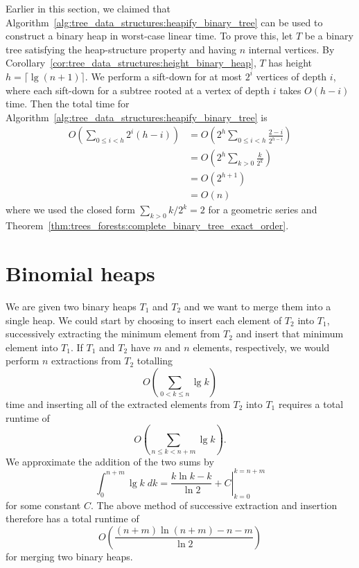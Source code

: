 Earlier in this section, we claimed that
Algorithm~\ref{alg:tree_data_structures:heapify_binary_tree} can be
used to construct a binary heap in worst-case linear time. To prove
this, let $T$ be a binary tree satisfying the heap-structure property
and having $n$ internal vertices. By
Corollary~\ref{cor:tree_data_structures:height_binary_heap}, $T$ has
height $h = \lceil \lg(n + 1) \rceil$. We perform a sift-down for at
most $2^i$ vertices of depth $i$, where each sift-down for a subtree
rooted at a vertex of depth $i$ takes $O(h - i)$ time. Then the total
time for Algorithm~\ref{alg:tree_data_structures:heapify_binary_tree}
is
\begin{align*}
O\left( \sum_{0 \leq i < h} 2^i (h - i) \right)
&=
O\left( 2^h \sum_{0 \leq i < h} \frac{2 - i} {2^{h - i}} \right) \\[4pt]
&=
O\left( 2^h \sum_{k > 0} \frac{k}{2^k} \right) \\[4pt]
&=
O\left( 2^{h + 1} \right) \\[4pt]
&=
O(n)
\end{align*}
where we used the closed form $\sum_{k > 0} k / 2^k = 2$ for a
geometric series and
Theorem~\ref{thm:trees_forests:complete_binary_tree_exact_order}.



\section{Binomial heaps}
\label{sec:tree_data_structures:binomial_heaps}

We are given two binary heaps $T_1$ and $T_2$ and we want to merge
them into a single heap. We could start by choosing to insert each
element of $T_2$ into $T_1$, successively extracting the minimum
element from $T_2$ and insert that minimum element into $T_1$. If
$T_1$ and $T_2$ have $m$ and $n$ elements, respectively, we would
perform $n$ extractions from $T_2$ totalling
\[
O\left( \sum_{0 < k \leq n} \lg k \right)
\]
time and inserting all of the extracted elements from $T_2$ into
$T_1$ requires a total runtime of
\begin{equation}
\label{eqn:tree_data_structures:total_runtime_inserting_n_extra_elements}
O\left( \sum_{n \leq k < n + m} \lg k \right).
\end{equation}
We approximate the addition of the two sums by
\[
\int_0^{n + m} \lg k \; dk
=
\left. \frac{k \ln k - k} {\ln 2} + C \right|_{k=0}^{k=n+m}
\]
for some constant $C$. The above method of successive extraction and
insertion therefore has a total runtime of
\[
O\left( \frac{(n + m) \ln(n + m) - n - m} {\ln 2} \right)
\]
for merging two binary heaps.

